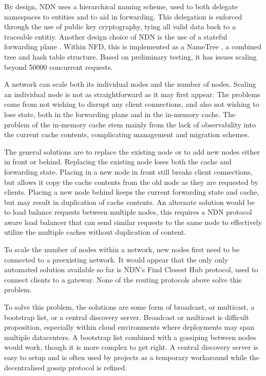 \documentclass[conference]{IEEEtran}
\begin{document}
By design, NDN uses a hierarchical naming scheme,
used to both delegate namespaces to entities and to aid in forwarding.
This delegation is enforced through the use of public key cryptography,
tying all valid data back to a traceable entitiy.
Another design choice of NDN is the use of a stateful forwarding plane \cite{statefulforward}.
Within NFD, this is implemented as a NameTree \cite{nfd}, a combined tree and hash table structure.
Based on preliminary testing, it has issues scaling beyond 50000 concurrent requests.

A network can scale both its individual nodes and the number of nodes.
Scaling an individual node is not as straightforward as it may first appear.
The problems come from not wishing to disrupt any client connections,
and also not wishing to lose state,
both in the forwarding plane and in the in-memory cache.
The problem of the in-memory cache
stem mainly from the lack of observability into the current cache contents,
complicating management and migration schemes.

The general solutions are to replace the existing node
or to add new nodes either in front or behind.
Replacing the existing node loses both the cache and forwarding state.
Placing in a new node in front still breaks client connections,
but allows it copy the cache contents
from the old node as they are requested by clients.
Placing a new node behind keeps the current forwarding state and cache,
but may result in duplication of cache contents.
An alternate solution would be to load balance requests between multiple nodes,
this requires a NDN protocol aware load balancer
that can send similar requests to the same node
to effectively utilize the multiple caches without duplication of content.

To scale the number of nodes within a network,
new nodes first need to be connected to a preexisting network.
It would appear that the only only automated solution available so far is NDN's
Find Closest Hub protocol, used to connect clients to a gateway.
None of the routing protocols above solve this problem.

To solve this problem, the solutions are some form of broadcast, or multicast,
a bootstrap list, or a central discovery server.
Broadcast or multicast is difficult proposition,
especially within cloud environments where deployments may span multiple datacenters.
A bootstrap list combined with a gossiping between nodes would work,
though it is more complex to get right.
A central discovery server is easy to setup and is often used by projects
as a temporary workaround while the decentralised gossip protocol is refined.
\end{document}

